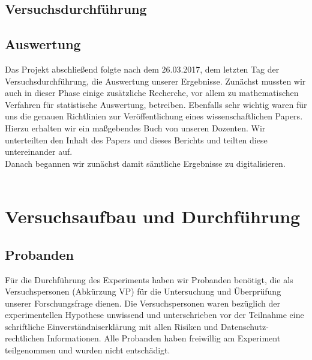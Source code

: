 \documentclass{Bericht}
\begin{document}

	\subsection{Versuchsdurchführung} %
	\subsection{Auswertung} %
	
Das Projekt abschließend folgte nach dem 26.03.2017, dem letzten Tag der Versuchsdurchführung, die Auswertung unserer Ergebnisse.
Zunächst mussten wir auch in dieser Phase einige zusätzliche Recherche, vor allem zu mathematischen Verfahren für statistische Auswertung, betreiben. Ebenfalls sehr wichtig waren für uns die genauen Richtlinien zur Veröffentlichung eines wissenschaftlichen Papers. Hierzu erhalten wir ein maßgebendes Buch von unseren Dozenten. Wir unterteilten den Inhalt des Papers und dieses Berichts und teilten diese untereinander auf.\\
Danach begannen wir zunächst damit sämtliche Ergebnisse zu digitalisieren.\\
\\

\section{Versuchsaufbau und Durchführung}
	\subsection{Probanden}
	Für die Durchführung des Experiments haben wir Probanden benötigt, die als Versuchspersonen
(Abkürzung VP) für die Untersuchung und Überprüfung unserer Forschungsfrage dienen.
Die Versuchspersonen waren bezüglich der experimentellen Hypothese unwissend und unterschrieben
vor der Teilnahme eine schriftliche Einverständniserklärung mit allen Risiken und Datenschutz-
rechtlichen Informationen. Alle Probanden haben freiwillig am Experiment teilgenommen
und wurden nicht entschädigt.
\end{document}
